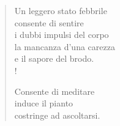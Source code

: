 
\begin{verse}
    Un leggero stato febbrile\\
    consente di sentire\\
    i dubbi impulsi del corpo\\
    la mancanza d'una carezza\\
    e il sapore del brodo.\\!

    Consente di meditare\\
    induce il pianto\\
    costringe ad ascoltarsi.
\end{verse}
